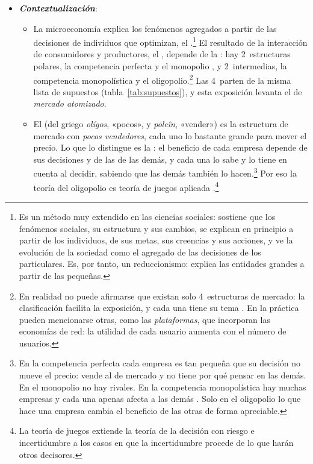\documentclass[11pt]{article}
\begin{document}
\begin{itemize}
\item \textbf{\emph{Contextualización}}:
  \begin{itemize}
  \item La microeconomía explica los fenómenos agregados a partir de las decisiones de individuos que optimizan, el .\footnote{Es un método muy extendido en las ciencias sociales: sostiene que los fenómenos sociales, su estructura y sus cambios, se explican en principio a partir de los individuos, de sus metas, sus creencias y sus acciones, y ve la evolución de la sociedad como el agregado de las decisiones de los particulares. Es, por tanto, un reduccionismo: explica las entidades grandes a partir de las pequeñas.} El resultado de la interacción de consumidores y productores, el , depende de la : hay 2~estructuras polares, la competencia perfecta  y el monopolio , y 2~intermedias, la competencia monopolística  y el oligopolio.\footnote{En realidad no puede afirmarse que existan solo 4~estructuras de mercado: la clasificación facilita la exposición, y cada una tiene su tema   . En la práctica pueden mencionarse otras, como las \emph{plataformas}, que incorporan las economías de red: la utilidad de cada usuario aumenta con el número de usuarios.} Las 4~parten de la misma lista de supuestos (tabla~\ref{tab:supuestos}), y esta exposición levanta el de \emph{mercado atomizado}.
  \item El  (del griego \emph{olígos}, «pocos», y \emph{pōleîn}, «vender») es la estructura de mercado con \emph{pocos vendedores}, cada uno lo bastante grande para mover el precio. Lo que lo distingue es la : el beneficio de cada empresa depende de sus decisiones y de las de las demás, y cada una lo sabe y lo tiene en cuenta al decidir, sabiendo que las demás también lo hacen.\footnote{En la competencia perfecta cada empresa es tan pequeña que su decisión no mueve el precio: vende al de mercado y no tiene por qué pensar en las demás. En el monopolio no hay rivales. En la competencia monopolística hay muchas empresas y cada una apenas afecta a las demás . Solo en el oligopolio lo que hace una empresa cambia el beneficio de las otras de forma apreciable.} Por eso la teoría del oligopolio es teoría de juegos aplicada .\footnote{La teoría de juegos extiende la teoría de la decisión con riesgo e incertidumbre  a los casos en que la incertidumbre procede de lo que harán otros decisores.}

\end{itemize}
\end{itemize}
\end{document}
